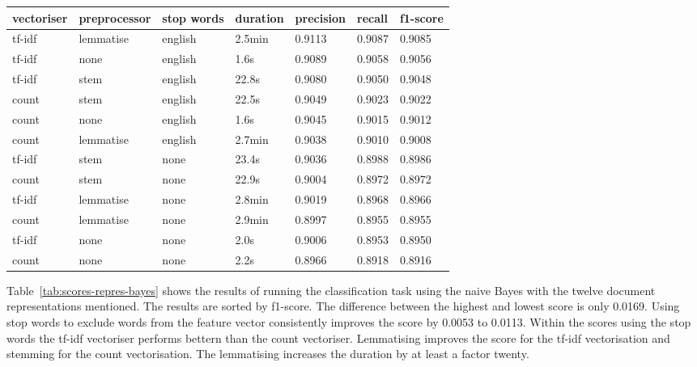 \documentclass[11pt]{article}
\begin{document}
\begin{table*}[h]\footnotesize
\centering
\label{tab:scores-repres-bayes}
\begin{tabular}{ l l l l l l l }
vectoriser & preprocessor & stop words & duration & precision & recall & f1-score \\
\hline
tf-idf & lemmatise & english & 2.5min & 0.9113 & 0.9087 & 0.9085 \\
tf-idf & none & english & 1.6s & 0.9089 & 0.9058 & 0.9056 \\
tf-idf & stem & english & 22.8s & 0.9080 & 0.9050 & 0.9048 \\
count & stem & english & 22.5s & 0.9049 & 0.9023 & 0.9022 \\
count & none & english & 1.6s & 0.9045 & 0.9015 & 0.9012 \\
count & lemmatise & english & 2.7min & 0.9038 & 0.9010 & 0.9008 \\
tf-idf & stem & none & 23.4s & 0.9036 & 0.8988 & 0.8986 \\
count & stem & none & 22.9s & 0.9004 & 0.8972 & 0.8972 \\
tf-idf & lemmatise & none & 2.8min & 0.9019 & 0.8968 & 0.8966 \\
count & lemmatise & none & 2.9min & 0.8997 & 0.8955 & 0.8955 \\
tf-idf & none & none & 2.0s & 0.9006 & 0.8953 & 0.8950 \\
count & none & none & 2.2s & 0.8966 & 0.8918 & 0.8916 \\
\end{tabular}
\caption{scores for different representations and the naive Bayes classifier sorted by f1-score}
\end{table*}

Table~\ref{tab:scores-repres-bayes} shows the results of running the classification task using the naive Bayes with the twelve document representations mentioned. The results are sorted by f1-score. The difference between the highest and lowest score is only 0.0169. Using stop words to exclude words from the feature vector consistently improves the score by 0.0053 to 0.0113. Within the scores using the stop words the tf-idf vectoriser performs bettern than the count vectoriser. Lemmatising improves the score for the tf-idf vectorisation and stemming for the count vectorisation. The lemmatising increases the duration by at least a factor twenty.
\end{document}

